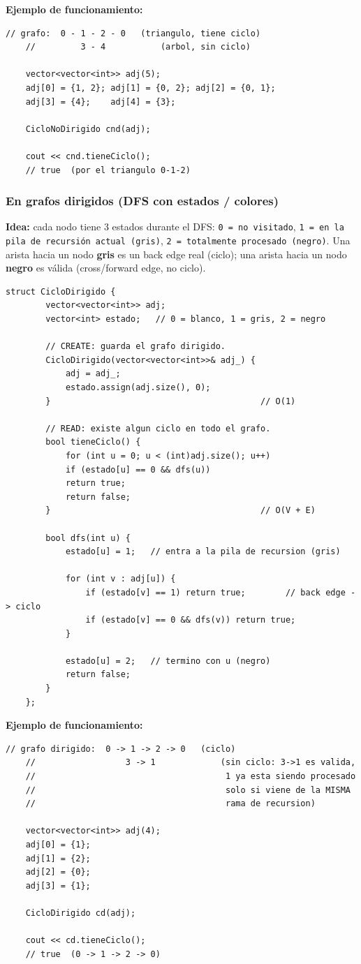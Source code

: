 \documentclass[10pt,a4paper,twocolumn]{article}
\begin{document}
\textbf{Ejemplo de funcionamiento:}

\begin{lstlisting}[style=cpp]
	// grafo:  0 - 1 - 2 - 0   (triangulo, tiene ciclo)
	//         3 - 4           (arbol, sin ciclo)
	
	vector<vector<int>> adj(5);
	adj[0] = {1, 2}; adj[1] = {0, 2}; adj[2] = {0, 1};
	adj[3] = {4};    adj[4] = {3};
	
	CicloNoDirigido cnd(adj);
	
	cout << cnd.tieneCiclo();
	// true  (por el triangulo 0-1-2)
\end{lstlisting}

\subsubsection{En grafos dirigidos (DFS con estados / colores)}

\textbf{Idea:} cada nodo tiene 3 estados durante el DFS: \texttt{0 =
	no visitado}, \texttt{1 = en la pila de recursión actual (gris)},
\texttt{2 = totalmente procesado (negro)}. Una arista hacia un nodo
\textbf{gris} es un back edge real (ciclo); una arista hacia un nodo
\textbf{negro} es válida (cross/forward edge, no ciclo).

\begin{lstlisting}[style=cpp]
	struct CicloDirigido {
		vector<vector<int>> adj;
		vector<int> estado;   // 0 = blanco, 1 = gris, 2 = negro
		
		// CREATE: guarda el grafo dirigido.
		CicloDirigido(vector<vector<int>>& adj_) {
			adj = adj_;
			estado.assign(adj.size(), 0);
		}                                          // O(1)
		
		// READ: existe algun ciclo en todo el grafo.
		bool tieneCiclo() {
			for (int u = 0; u < (int)adj.size(); u++)
			if (estado[u] == 0 && dfs(u))
			return true;
			return false;
		}                                          // O(V + E)
		
		bool dfs(int u) {
			estado[u] = 1;   // entra a la pila de recursion (gris)
			
			for (int v : adj[u]) {
				if (estado[v] == 1) return true;        // back edge -> ciclo
				if (estado[v] == 0 && dfs(v)) return true;
			}
			
			estado[u] = 2;   // termino con u (negro)
			return false;
		}
	};
\end{lstlisting}

\textbf{Ejemplo de funcionamiento:}

\begin{lstlisting}[style=cpp]
	// grafo dirigido:  0 -> 1 -> 2 -> 0   (ciclo)
	//                  3 -> 1             (sin ciclo: 3->1 es valida,
	//                                      1 ya esta siendo procesado
	//                                      solo si viene de la MISMA
	//                                      rama de recursion)
	
	vector<vector<int>> adj(4);
	adj[0] = {1};
	adj[1] = {2};
	adj[2] = {0};
	adj[3] = {1};
	
	CicloDirigido cd(adj);
	
	cout << cd.tieneCiclo();
	// true  (0 -> 1 -> 2 -> 0)
\end{lstlisting}
\end{document}
